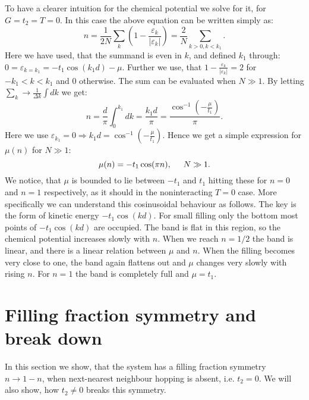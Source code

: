 To have a clearer intuition for the chemical potential we solve for it, for $G = t_2 = T = 0$. In this case the above equation can be written simply as:
\begin{equation}
n = \frac{1}{2N}\sum_k \left( 1 - \frac{\varepsilon_k}{|\varepsilon_k|}\right) = \frac{2}{N}\sum_{k > 0, k < k_1}. \nonumber
\end{equation}
Here we have used, that the summand is even in $k$, and defined $k_1$ through: $0 = \varepsilon_{k = k_1} = -t_1\cos(k_1d) - \mu$. Further we use, that $1 - \frac{\varepsilon_k}{|\varepsilon_k|} = 2$ for $-k_1 < k < k_1$ and $0$ otherwise. The sum can be evaluated when $N \gg 1$. By letting $\sum_k \to \frac{1}{\Delta k}\int dk$ we get:
\begin{equation}
n = \frac{d}{\pi}\int_0^{k_1} dk =  \frac{k_1d}{\pi} = \frac{\cos^{-1}\left(-\frac{\mu}{t_1}\right)}{\pi}. \nonumber
\end{equation}
Here we use $\varepsilon_{k_1} = 0 \Rightarrow k_1d = \cos^{-1}\left(-\frac{\mu}{t_1}\right)$. Hence we get a simple expression for $\mu(n)$ for $N\gg 1$:
\begin{equation}
\mu(n) = -t_1\cos(\pi n), \hspace{0.5cm} N\gg 1.
\label{eq.mun.T0.G0.lattice}
\end{equation}
We notice, that $\mu$ is bounded to lie between $-t_1$ and $t_1$ hitting these for $n = 0$ and $n = 1$ respectively, as it should in the noninteracting $T = 0$ case. More specifically we can understand this cosinusoidal behaviour as follows. The key is the form of kinetic energy $-t_1\cos(kd)$. For small filling only the bottom most points of $-t_1\cos(kd)$ are occupied. The band is flat in this region, so the chemical potential increases slowly with $n$. When we reach $n = 1/2$ the band is linear, and there is a linear relation between $\mu$ and $n$. When the filling becomes very close to one, the band again flattens out and $\mu$ changes very slowly with rising $n$. For $n = 1$ the band is completely full and $\mu = t_1$. 

\section{Filling fraction symmetry and break down}
\label{sec.fillingfractionsymmetry.breakdown}
In this section we show, that the system has a filling fraction symmetry $n \to 1 - n$, when next-nearest neighbour hopping is absent, i.e. $t_2 = 0$. We will also show, how $t_2 \neq 0$ breaks this symmetry. 

